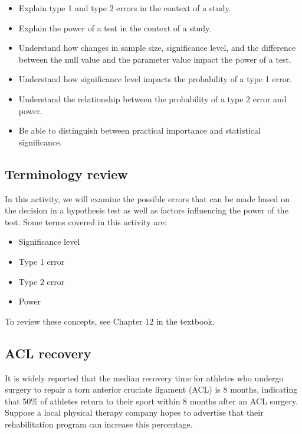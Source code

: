 \documentclass[
]{report}
\begin{document}
\begin{itemize}
\item
  Explain type 1 and type 2 errors in the context of a study.
\item
  Explain the power of a test in the context of a study.
\item
  Understand how changes in sample size, significance level, and the difference between the null value and the parameter value impact the power of a test.
\item
  Understand how significance level impacts the probability of a type 1 error.
\item
  Understand the relationship between the probability of a type 2 error and power.
\item
  Be able to distinguish between practical importance and statistical significance.
\end{itemize}

\hypertarget{terminology-review-12}{%
\subsection{Terminology review}\label{terminology-review-12}}

In this activity, we will examine the possible errors that can be made based on the decision in a hypothesis test as well as factors influencing the power of the test. Some terms covered in this activity are:

\begin{itemize}
\item
  Significance level
\item
  Type 1 error
\item
  Type 2 error
\item
  Power
\end{itemize}

To review these concepts, see Chapter 12 in the textbook.

\hypertarget{acl-recovery}{%
\subsection{ACL recovery}\label{acl-recovery}}

It is widely reported that the median recovery time for athletes who undergo surgery to repair a torn anterior cruciate ligament (ACL) is 8 months, indicating that 50\% of athletes return to their sport within 8 months after an ACL surgery. Suppose a local physical therapy company hopes to advertise that their rehabilitation program can increase this percentage.
\end{document}
